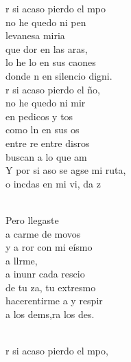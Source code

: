\documentclass[12pt]{article}
\begin{document}
\begin{multicols*}{2}
\begin{cancion}%
	r si acaso pierdo el mpo \\
	no he quedo ni pen \\
	levanesa miria \\
	que dor en las aras, \\
	lo he lo en sus caones \\
	donde n en silencio digni. \\
	r si acaso pierdo el ño, \\
	no he quedo ni mir\\
	en pedicos y tos\\
	como ln en sus os \\
	entre re entre disros\\
	buscan  a lo que am \\
	Y por si aso se agse mi ruta,\\
	o incdas en mi vi, da z\\\jump\\
	\begin{chorus}%
	Pero llegaste   \\
	a carme de movos\\
	y a ror con mi eísmo\\
	a llrme, \\
	a inunr cada rescio\\
	de tu za, tu extresmo \\
	hacerentirme a y respir \\
	a los dems,ra los des. \\
	\end{chorus}%
	\jump\\
	r si acaso pierdo el mpo, \\

\end{cancion}
\end{multicols*}
\end{document}
